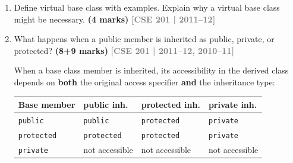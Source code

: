\documentclass[12pt,a3paper]{article}
\newcommand{\yr}[1]{\hfill\textcolor{gray}{\small\textbf{[#1]}}}
\newcommand{\mk}[1]{\textcolor{orange!70!black}{\small\textbf{(#1 marks)}}}
\begin{document}
\begin{enumerate}
\begin{tcolorbox}
\textbf{Pure Virtual Function:} Has \textbf{no} implementation in
the base class (\texttt{= 0}); derived classes \emph{must} override
it.  Makes the class abstract.
\begin{lstlisting}[language=C++]
class Shape { public: virtual double area() const = 0; };
\end{lstlisting}

\textbf{Early binding (compile time):} Function call resolved by the
compiler based on the declared type.  Non-virtual functions.

\textbf{Late binding (run time):} Function call resolved at run time
based on the actual object type.  Virtual functions via vtable.

\begin{lstlisting}[language=C++]
class A { public: void f(){cout<<"A::f\n";} virtual void g(){cout<<"A::g\n";} };
class B : public A { public: void f(){cout<<"B::f\n";} void g() override{cout<<"B::g\n";} };

A* p=new B();
p->f();  // early binding: A::f (declared type is A*)
p->g();  // late binding:  B::g (actual object is B)
\end{lstlisting}

\end{tcolorbox}

\item Define virtual base class with examples. Explain why a virtual base class might be necessary. \mk{4}
\yr{CSE 201 | 2011--12}

\item What happens when a public member is inherited as public, private, or protected? \mk{8+9}
\yr{CSE 201 | 2011--12, 2010--11}

\begin{tcolorbox}[enhanced,breakable,ansbox,colback=cG!4,colframe=cG,
  boxrule=0.8pt,arc=5pt,
  title={\textbf{Answer --- Member visibility table for public/private/protected inheritance}},
  fonttitle=\bfseries\color{white},colbacktitle=cG]

When a base class member is inherited, its accessibility in the
derived class depends on \textbf{both} the original access specifier
\textbf{and} the inheritance type:

\begin{center}
\small
\begin{tabular}{@{}llll@{}}
\toprule
\textbf{Base member} & \textbf{public inh.} & \textbf{protected inh.} & \textbf{private inh.} \\
\midrule
\texttt{public}    & \texttt{public}    & \texttt{protected} & \texttt{private} \\
\texttt{protected} & \texttt{protected} & \texttt{protected} & \texttt{private} \\
\texttt{private}   & not accessible     & not accessible     & not accessible \\
\bottomrule
\end{tabular}
\end{center}


\end{tcolorbox}
\end{enumerate}
\end{document}
